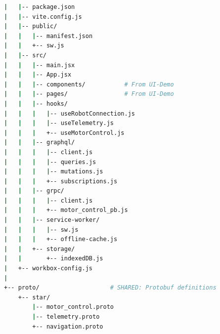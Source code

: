 \begin{lstlisting}[language=bash, caption=Complete Repository Structure]
|   |-- package.json
|   |-- vite.config.js
|   |-- public/
|   |   |-- manifest.json
|   |   +-- sw.js
|   |-- src/
|   |   |-- main.jsx
|   |   |-- App.jsx
|   |   |-- components/           # From UI-Demo
|   |   |-- pages/                # From UI-Demo
|   |   |-- hooks/
|   |   |   |-- useRobotConnection.js
|   |   |   |-- useTelemetry.js
|   |   |   +-- useMotorControl.js
|   |   |-- graphql/
|   |   |   |-- client.js
|   |   |   |-- queries.js
|   |   |   |-- mutations.js
|   |   |   +-- subscriptions.js
|   |   |-- grpc/
|   |   |   |-- client.js
|   |   |   +-- motor_control_pb.js
|   |   |-- service-worker/
|   |   |   |-- sw.js
|   |   |   +-- offline-cache.js
|   |   +-- storage/
|   |       +-- indexedDB.js
|   +-- workbox-config.js
|
+-- proto/                    # SHARED: Protobuf definitions
    +-- star/
        |-- motor_control.proto
        |-- telemetry.proto
        +-- navigation.proto
\end{lstlisting}
